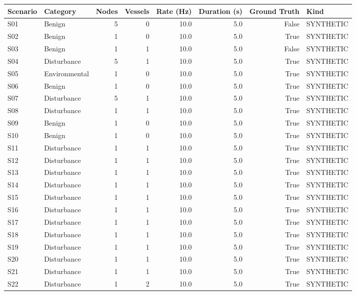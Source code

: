 \begin{tabular}{llrrrrrl}
\toprule
Scenario & Category & Nodes & Vessels & Rate (Hz) & Duration (s) & Ground Truth & Kind \\
\midrule
S01 & Benign & 5 & 0 & 10.0 & 5.0 & False & SYNTHETIC \\
S02 & Benign & 1 & 0 & 10.0 & 5.0 & True & SYNTHETIC \\
S03 & Benign & 1 & 1 & 10.0 & 5.0 & False & SYNTHETIC \\
S04 & Disturbance & 5 & 1 & 10.0 & 5.0 & True & SYNTHETIC \\
S05 & Environmental & 1 & 0 & 10.0 & 5.0 & True & SYNTHETIC \\
S06 & Benign & 1 & 0 & 10.0 & 5.0 & True & SYNTHETIC \\
S07 & Disturbance & 5 & 1 & 10.0 & 5.0 & True & SYNTHETIC \\
S08 & Disturbance & 1 & 1 & 10.0 & 5.0 & True & SYNTHETIC \\
S09 & Benign & 1 & 0 & 10.0 & 5.0 & True & SYNTHETIC \\
S10 & Benign & 1 & 0 & 10.0 & 5.0 & True & SYNTHETIC \\
S11 & Disturbance & 1 & 1 & 10.0 & 5.0 & True & SYNTHETIC \\
S12 & Disturbance & 1 & 1 & 10.0 & 5.0 & True & SYNTHETIC \\
S13 & Disturbance & 1 & 1 & 10.0 & 5.0 & True & SYNTHETIC \\
S14 & Disturbance & 1 & 1 & 10.0 & 5.0 & True & SYNTHETIC \\
S15 & Disturbance & 1 & 1 & 10.0 & 5.0 & True & SYNTHETIC \\
S16 & Disturbance & 1 & 1 & 10.0 & 5.0 & True & SYNTHETIC \\
S17 & Disturbance & 1 & 1 & 10.0 & 5.0 & True & SYNTHETIC \\
S18 & Disturbance & 1 & 1 & 10.0 & 5.0 & True & SYNTHETIC \\
S19 & Disturbance & 1 & 1 & 10.0 & 5.0 & True & SYNTHETIC \\
S20 & Disturbance & 1 & 1 & 10.0 & 5.0 & True & SYNTHETIC \\
S21 & Disturbance & 1 & 1 & 10.0 & 5.0 & True & SYNTHETIC \\
S22 & Disturbance & 1 & 2 & 10.0 & 5.0 & True & SYNTHETIC \\
\bottomrule
\end{tabular}
